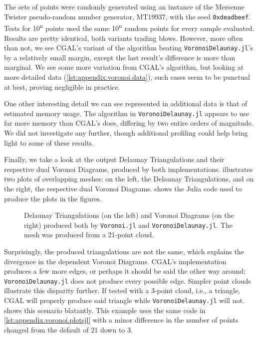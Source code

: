 The sets of points were randomly generated using an instance of the Mersenne
Twister pseudo-random number generator, MT19937, with the seed
\texttt{0xdeadbeef}.  Tests for 10\textsuperscript{n} points used the same
10\textsuperscript{n} random points for every sample evaluated.  Results are
pretty identical, both variants trading blows.  However, more often than not, we
see \ac{CGAL}'s variant of the algorithm beating \texttt{VoronoiDelaunay.jl}'s
by a relatively small margin, except the last result's difference is more than
marginal.  We see some more variation from \ac{CGAL}'s algorithm, but looking at
more detailed data (\cref{lst:appendix.voronoi.data}), such cases seem to be
punctual at best, proving negligible in practice.

One other interesting detail we can see represented in additional data is that
of estimated memory usage.  The algorithm in \texttt{VoronoiDelaunay.jl} appears
to use far more memory than \ac{CGAL}'s does, differing by two entire orders of
magnitude.  We did not investigate any further, though additional profiling
could help bring light to some of these results.

Finally, we take a look at the output Delaunay Triangulations and their
respective dual Voronoi Diagrams, produced by both implementations.
 illustrates two plots of overlapping meshes: on
the left, the Delaunay Triangulations, and on the right, the respective dual
Voronoi Diagrams.   shows the Julia code used
to produce the plots in the figures.

\begin{figure}[!htb]
  \resizebox{\linewidth}{!}{}
  \caption[Voronoi Delaunay output comparison]{
    Delaunay Triangulations (on the left) and Voronoi Diagrams (on the right)
    produced both by \texttt{Voronoi.jl} and \texttt{VoronoiDelaunay.jl}.  The
    mesh was produced from a 21-point cloud.}%
  \label{fig:eval.voronoi.output}
\end{figure}

Surprisingly, the produced triangulations are not the same, which explains the
divergence in the dependent Voronoi Diagrams.  \Ac{CGAL}'s implementation
produces a few more edges, or perhaps it should be said the other way around:
\texttt{VoronoiDelaunay.jl} does not produce every possible edge.  Simpler point
clouds illustrate this disparity further.  If tested with a 3-point cloud, i.e.,
a triangle, \ac{CGAL} will properly produce said triangle while
\texttt{VoronoiDelaunay.jl} will not.   shows
this scenario blatantly.  This example uses the same code in
\cref{lst:appendix.voronoi.plotsjl} with a minor difference in the number of
points changed from the default of 21 down to 3.

